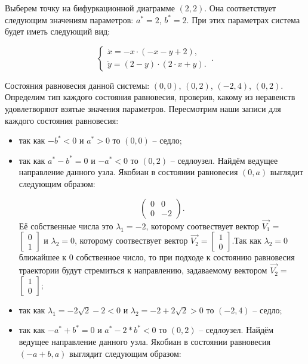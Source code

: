 Выберем точку на бифуркационной диаграмме $(2, 2)$. Она соответствует следующим значениям параметров:  $a^\ast = 2$, $b^\ast = 2$. При этих параметрах система будет иметь следующий вид: 

$$
\left \lbrace 
\begin{matrix} 
	\dot{x} = -x \cdot (-x - y + 2), \\
	\dot{y} = (2 - y) \cdot (2 \cdot x + y). \
\end{matrix} 
\right . .$$

Состояния равновесия данной системы: $(0, 0)$, $(0, 2)$, $(-2, 4)$, $(0, 2)$. Определим тип каждого состояния равновесия, проверив, какому из неравенств удовлетворяют взятые значения параметров.  Пересмотрим наши записи для каждого состояния равновесия: 
\begin{itemize}
	\item{ так как $-b^\ast  < 0 $ и $a^\ast > 0 $ то $(0, 0)$ -- седло;}
	\item{ так как $a^\ast - b^\ast = 0 $ и $-a^\ast  < 0 $ то $(0, 2)$ -- седлоузел. Найдём ведущее направление данного узла. Якобиан в состоянии равновесия $(0, a)$ выглядит следующим образом:
		
		$$\begin{pmatrix}0 & 0\\0 & -2\end{pmatrix}. $$Её собственные числа это $\lambda_1=-2$, которому соотвествует вектор $\Vec{V_1}=$ $\left[\begin{matrix}0\\1\end{matrix}\right]$ и $\lambda_2=0$, которому соотвествует вектор $\Vec{V_2}=$$\left[\begin{matrix}1\\0\end{matrix}\right]$.Так как $\lambda_2=0$ ближайшее к $0$ собственное число, то при подходе к состоянию равновесия траектории будут стремиться к направлению, задаваемому вектором $\Vec{V_2}=$ $\left[\begin{matrix}1\\0\end{matrix}\right]$;}
	\item{ так как ${\lambda_{1}} = - 2 \sqrt{2} - 2$$  < 0 $ и ${\lambda_{2}} = -2 + 2 \sqrt{2}$$ > 0 $ то $(-2, 4)$ -- седло;}
	\item{ так как $-a^\ast + b^\ast = 0 $ и $a^\ast - 2*b^\ast  < 0 $ то $(0, 2)$ -- седлоузел. Найдём ведущее направление данного узла. Якобиан в состоянии равновесия $(-a + b, a)$ выглядит следующим образом:
		
}
\end{itemize}
